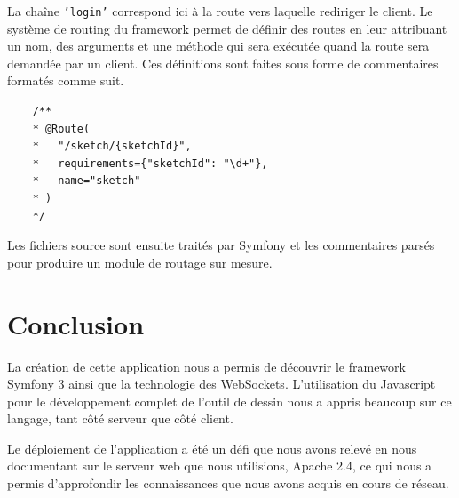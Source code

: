\documentclass[a4paper]{article}
\begin{document}
La chaîne \texttt{'login'} correspond ici à la route vers laquelle rediriger le client. Le système de routing du framework permet de définir des routes en leur attribuant un nom, des arguments et une méthode qui sera exécutée quand la route sera demandée par un client. Ces définitions sont faites sous forme de commentaires formatés comme suit.
\begin{lstlisting}
	/**
	* @Route(
	*   "/sketch/{sketchId}",
	*   requirements={"sketchId": "\d+"},
	*   name="sketch"
	* )
	*/
\end{lstlisting}
Les fichiers source sont ensuite traités par Symfony et les commentaires parsés pour produire un module de routage sur mesure.

\section{Conclusion}
La création de cette application nous a permis de découvrir le framework Symfony 3 ainsi que la technologie des WebSockets. L'utilisation du Javascript pour le développement complet de l'outil de dessin nous a appris beaucoup sur ce langage, tant côté serveur que côté client.

Le déploiement de l'application a été un défi que nous avons relevé en nous documentant sur le serveur web que nous utilisions, Apache 2.4, ce qui nous a permis d'approfondir les connaissances que nous avons acquis en cours de réseau.
\newpage


\end{document}

